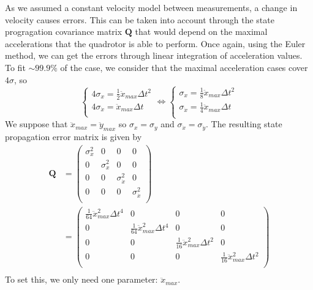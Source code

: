 \documentclass[12pt]{article}
\begin{document}
As we assumed a constant velocity model between measurements, a change in velocity causes errors.
This can be taken into account through the state progragation covariance matrix $\mathbf{Q}$ that would depend on the maximal accelerations that the quadrotor is able to perform.
Once again, using the Euler method, we can get the errors through linear integration of acceleration values.
To fit $\sim 99.9\%$ of the case, we consider that the maximal acceleration cases cover $4\sigma$, so
\begin{equation}
\left\{
    \begin{array}{l}
    4 \sigma_x = \frac{1}{2} \ddot{x}_{max} \Delta{t}^2 \\
    4 \sigma_{\dot{x}} = \ddot{x}_{max} \Delta{t} \\
    \end{array}
\right.
\Leftrightarrow
\left\{
    \begin{array}{l}
    \sigma_x = \frac{1}{8} \ddot{x}_{max} \Delta{t}^2 \\
    \sigma_{\dot{x}} = \frac{1}{4} \ddot{x}_{max} \Delta{t} \\
    \end{array}
\right.
\end{equation}
We suppose that $\ddot{x}_{max} = \ddot{y}_{max}$ so $\sigma_x = \sigma_y$ and $\sigma_{\dot{x}} = \sigma_{\dot{y}}$.
The resulting state propagation error matrix is given by
\begin{equation}
\begin{split}
\mathbf{Q}
    & =
    \begin{pmatrix}
        \sigma_x^2 & 0 & 0 & 0 \\
        0 & \sigma_x^2 & 0 & 0 \\
        0 & 0 & \sigma_{\dot{x}}^2 & 0 \\
        0 & 0 & 0 & \sigma_{\dot{x}}^2 \\
    \end{pmatrix}
    \\
    & =
    \begin{pmatrix}
        \frac{1}{64} \ddot{x}_{max}^2 \Delta{t}^4 & 0 & 0 & 0 \\
        0 & \frac{1}{64} \ddot{x}_{max}^2 \Delta{t}^4 & 0 & 0 \\
        0 & 0 & \frac{1}{16} \ddot{x}_{max}^2 \Delta{t}^2 & 0 \\
        0 & 0 & 0 & \frac{1}{16} \ddot{x}_{max}^2 \Delta{t}^2 \\
    \end{pmatrix}
    \\
\end{split}
\end{equation}
To set this, we only need one parameter: $\ddot{x}_{max}$.
\end{document}
